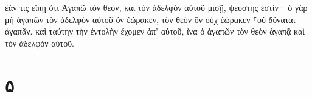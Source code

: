 \documentclass{openreader}
\begin{document}
ἐάν τις εἴπῃ ὅτι Ἀγαπῶ τὸν θεόν, καὶ τὸν ἀδελφὸν αὐτοῦ μισῇ, ψεύστης ἐστίν· ὁ γὰρ μὴ ἀγαπῶν τὸν ἀδελφὸν αὐτοῦ ὃν ἑώρακεν, τὸν θεὸν ὃν οὐχ ἑώρακεν ⸀οὐ δύναται ἀγαπᾶν. καὶ ταύτην τὴν ἐντολὴν ἔχομεν ἀπ’ αὐτοῦ, ἵνα ὁ ἀγαπῶν τὸν θεὸν ἀγαπᾷ καὶ τὸν ἀδελφὸν αὐτοῦ. \section*{۵}
\end{document}
